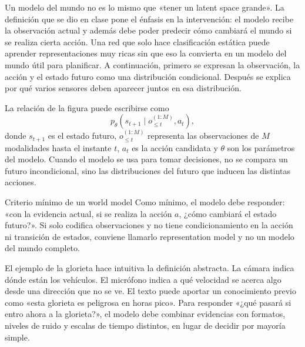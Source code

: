 Un modelo del mundo no es lo mismo que «tener un latent space grande». La definición que se dio en clase pone el énfasis en la intervención: el modelo recibe la observación actual y además debe poder predecir cómo cambiará el mundo si se realiza cierta acción. Una red que solo hace clasificación estática puede aprender representaciones muy ricas sin que eso la convierta en un modelo del mundo útil para planificar. A continuación, primero se expresan la observación, la acción y el estado futuro como una distribución condicional. Después se explica por qué varios sensores deben aparecer juntos en esa distribución.


La relación de la figura puede escribirse como
\[
p_\theta(s_{t+1}\mid o_{\le t}^{(1:M)},a_t),
\]
donde $s_{t+1}$ es el estado futuro, $o_{\le t}^{(1:M)}$ representa las observaciones de $M$ modalidades hasta el instante $t$, $a_t$ es la acción candidata y $\theta$ son los parámetros del modelo. Cuando el modelo se usa para tomar decisiones, no se compara un futuro incondicional, sino las distribuciones del futuro que inducen las distintas acciones.

\begin{importantbox}{Criterio mínimo de un world model}
Como mínimo, el modelo debe responder: «con la evidencia actual, si se realiza la acción $a$, ¿cómo cambiará el estado futuro?». Si solo codifica observaciones y no tiene condicionamiento en la acción ni transición de estados, conviene llamarlo representation model y no un modelo del mundo completo.
\end{importantbox}


El ejemplo de la glorieta hace intuitiva la definición abstracta. La cámara indica dónde están los vehículos. El micrófono indica a qué velocidad se acerca algo desde una dirección que no se ve. El texto puede aportar un conocimiento previo como «esta glorieta es peligrosa en horas pico». Para responder «¿qué pasará si entro ahora a la glorieta?», el modelo debe combinar evidencias con formatos, niveles de ruido y escalas de tiempo distintos, en lugar de decidir por mayoría simple.


